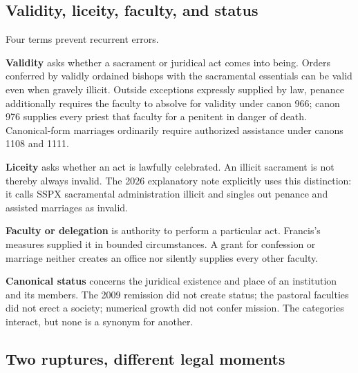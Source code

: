 \subsection{Validity, liceity, faculty, and status}

Four terms prevent recurrent errors.

\textbf{Validity} asks whether a sacrament or juridical act comes into being. Orders conferred by validly ordained bishops with the sacramental essentials can be valid even when gravely illicit. Outside exceptions expressly supplied by law, penance additionally requires the faculty to absolve for validity under canon 966; canon 976 supplies every priest that faculty for a penitent in danger of death. Canonical-form marriages ordinarily require authorized assistance under canons 1108 and 1111.

\textbf{Liceity} asks whether an act is lawfully celebrated. An illicit sacrament is not thereby always invalid. The 2026 explanatory note explicitly uses this distinction: it calls SSPX sacramental administration illicit and singles out penance and assisted marriages as invalid.

\textbf{Faculty or delegation} is authority to perform a particular act. Francis's measures supplied it in bounded circumstances. A grant for confession or marriage neither creates an office nor silently supplies every other faculty.

\textbf{Canonical status} concerns the juridical existence and place of an institution and its members. The 2009 remission did not create status; the pastoral faculties did not erect a society; numerical growth did not confer mission. The categories interact, but none is a synonym for another.


\subsection{Two ruptures, different legal moments}

